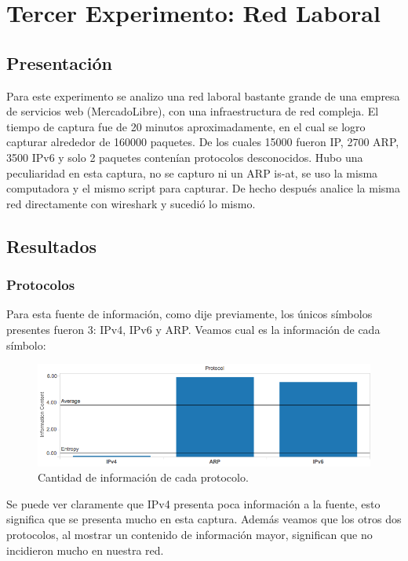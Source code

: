 \documentclass{article}
\theoremstyle{definition}
\theoremstyle{remark}
\begin{document}
\newpage

\section{Tercer Experimento: Red Laboral}

\subsection{Presentación}
Para este experimento se analizo una red laboral bastante grande de una empresa de servicios web (MercadoLibre), con una infraestructura de red compleja. 
El tiempo de captura fue de 20 minutos aproximadamente, en el cual se logro capturar alrededor de 160000 paquetes. De los cuales 15000 fueron IP, 2700 ARP, 3500 IPv6 y solo 2 paquetes contenían protocolos desconocidos.
Hubo una peculiaridad en esta captura, no se capturo ni un ARP is-at, se uso la misma computadora y el mismo script para capturar. De hecho después analice la misma red directamente con wireshark y sucedió lo mismo.

\subsection{Resultados}
\subsubsection{Protocolos}
Para esta fuente de información, como dije previamente, los únicos símbolos presentes fueron 3: IPv4, IPv6 y ARP. Veamos cual es la información de cada símbolo:

\begin{figure}[H]
\centering
\includegraphics[width=420pt]{captures/MercadoLibre/Protocol PDF Dashboard.png}
\caption{Cantidad de información de cada protocolo.}
\end{figure}

Se puede ver claramente que IPv4 presenta poca información a la fuente, esto significa que se presenta mucho en esta captura. Además veamos que los otros dos protocolos, al mostrar un contenido de información mayor, significan que no incidieron mucho en nuestra red.
\end{document}
